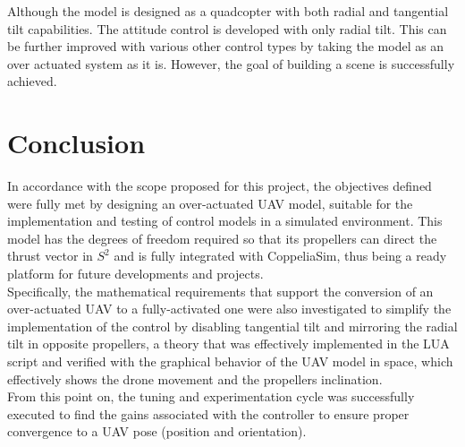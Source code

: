 \documentclass[a4paper, 12pt, oneside]{book}
\begin{document}
Although the model is designed as a quadcopter with both radial and tangential tilt capabilities. The attitude control is developed with only radial tilt. This can be further improved with various other control types by taking the model as an over actuated system as it is. However, the goal of building a scene is successfully achieved. 

\chapter{Conclusion}\label{conclu}
In accordance with the scope proposed for this project, the objectives defined were fully met by designing an over-actuated UAV model, suitable for the implementation and testing of control models in a simulated environment. This model has the degrees of freedom required so that its propellers can direct the thrust vector in $S^2$ and is fully integrated with CoppeliaSim, thus being a ready platform for future developments and projects.\\

Specifically, the mathematical requirements that support the conversion of an over-actuated UAV to a fully-activated one were also investigated to simplify the implementation of the control by disabling tangential tilt and mirroring the radial tilt in opposite propellers, a theory that was effectively implemented in the LUA script and verified with the graphical behavior of the UAV model in space, which effectively shows the drone movement and the propellers inclination.\\

From this point on, the tuning and experimentation cycle was successfully executed to find the gains associated with the controller to ensure proper convergence to a UAV pose (position and orientation).



\end{document}
